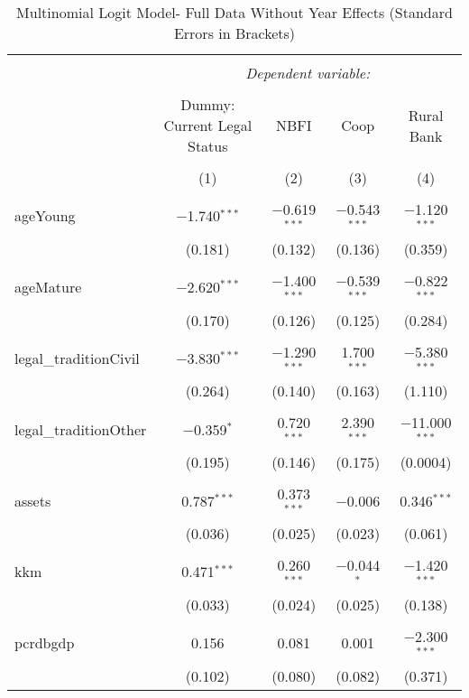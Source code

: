 \documentclass[a4paper,nobind]{templates/ociamthesis}
\begin{document}
\begin{table}[!htbp] \centering 
  \caption{Multinomial Logit Model- Full Data Without Year Effects (Standard Errors in Brackets)} 
  \label{} 
\footnotesize 
\begin{tabular}{@{\extracolsep{5pt}}lcccc} 
\\[-1.8ex]\hline 
\hline \\[-1.8ex] 
 & \multicolumn{4}{c}{\textit{Dependent variable:}} \\ 
\cline{2-5} 
\\[-1.8ex] & Dummy: Current Legal Status & NBFI & Coop & Rural Bank \\ 
\\[-1.8ex] & (1) & (2) & (3) & (4)\\ 
\hline \\[-1.8ex] 
 ageYoung & $-$1.740$^{***}$ & $-$0.619$^{***}$ & $-$0.543$^{***}$ & $-$1.120$^{***}$ \\ 
  & (0.181) & (0.132) & (0.136) & (0.359) \\ 
  & & & & \\ 
 ageMature & $-$2.620$^{***}$ & $-$1.400$^{***}$ & $-$0.539$^{***}$ & $-$0.822$^{***}$ \\ 
  & (0.170) & (0.126) & (0.125) & (0.284) \\ 
  & & & & \\ 
 legal\_traditionCivil & $-$3.830$^{***}$ & $-$1.290$^{***}$ & 1.700$^{***}$ & $-$5.380$^{***}$ \\ 
  & (0.264) & (0.140) & (0.163) & (1.110) \\ 
  & & & & \\ 
 legal\_traditionOther & $-$0.359$^{*}$ & 0.720$^{***}$ & 2.390$^{***}$ & $-$11.000$^{***}$ \\ 
  & (0.195) & (0.146) & (0.175) & (0.0004) \\ 
  & & & & \\ 
 assets & 0.787$^{***}$ & 0.373$^{***}$ & $-$0.006 & 0.346$^{***}$ \\ 
  & (0.036) & (0.025) & (0.023) & (0.061) \\ 
  & & & & \\ 
 kkm & 0.471$^{***}$ & 0.260$^{***}$ & $-$0.044$^{*}$ & $-$1.420$^{***}$ \\ 
  & (0.033) & (0.024) & (0.025) & (0.138) \\ 
  & & & & \\ 
 pcrdbgdp & 0.156 & 0.081 & 0.001 & $-$2.300$^{***}$ \\ 
  & (0.102) & (0.080) & (0.082) & (0.371) \\ 

\end{tabular}
\end{table}
\end{document}
